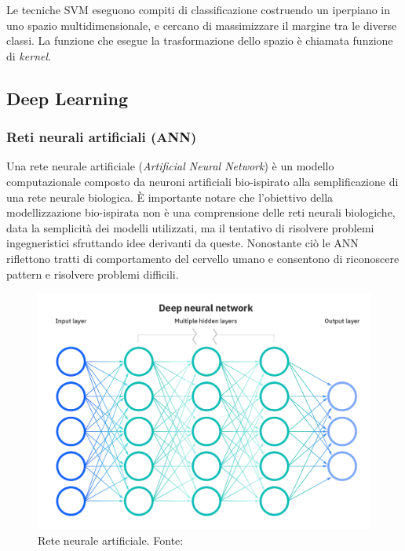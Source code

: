 Le tecniche SVM eseguono compiti di classificazione costruendo un iperpiano in uno spazio multidimensionale, e cercano di massimizzare il margine tra le diverse classi. La funzione che esegue la trasformazione dello spazio è chiamata funzione di \textit{kernel}.

\subsection{Deep Learning}

\subsubsection{Reti neurali artificiali (ANN)}

Una rete neurale artificiale (\textit{Artificial Neural Network}) è un modello computazionale composto da neuroni artificiali bio-ispirato alla semplificazione di una rete neurale biologica. È importante notare che l'obiettivo della modellizzazione bio-ispirata non è una comprensione delle reti neurali biologiche, data la semplicità dei modelli utilizzati, ma il tentativo di risolvere problemi ingegneristici sfruttando idee derivanti da queste. Nonostante ciò le ANN riflettono tratti di comportamento del cervello umano e consentono di riconoscere pattern e risolvere problemi difficili.

\begin{figure}[!h]
	\centering
	\includegraphics[scale=0.2]{images/ann.png}
	\caption{Rete neurale artificiale. Fonte: \cite{neuralNetworksIBM}}
	\label{fig:rete-neurale}
\end{figure}

